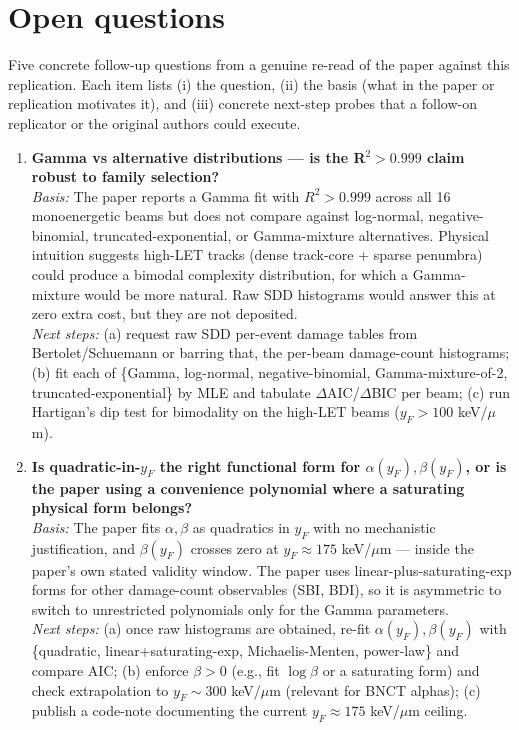 \section{Open questions}

Five concrete follow-up questions from a genuine re-read of the paper against
this replication. Each item lists (i) the question, (ii) the basis (what in
the paper or replication motivates it), and (iii) concrete next-step probes
that a follow-on replicator or the original authors could execute.

\begin{enumerate}

\item \textbf{Gamma vs alternative distributions --- is the R$^2 > 0.999$ claim
robust to family selection?} \\
\emph{Basis:} The paper reports a Gamma fit with $R^2 > 0.999$ across all 16
monoenergetic beams but does not compare against log-normal, negative-binomial,
truncated-exponential, or Gamma-mixture alternatives. Physical intuition
suggests high-LET tracks (dense track-core + sparse penumbra) could produce a
bimodal complexity distribution, for which a Gamma-mixture would be more
natural. Raw SDD histograms would answer this at zero extra cost, but they
are not deposited. \\
\emph{Next steps:} (a) request raw SDD per-event damage tables from
Bertolet/Schuemann or barring that, the per-beam damage-count histograms;
(b) fit each of \{Gamma, log-normal, negative-binomial, Gamma-mixture-of-2,
truncated-exponential\} by MLE and tabulate $\Delta$AIC/$\Delta$BIC per beam;
(c) run Hartigan's dip test for bimodality on the high-LET beams
($y_F > 100$ keV/$\mu$m).

\item \textbf{Is quadratic-in-$y_F$ the right functional form for
$\alpha(y_F), \beta(y_F)$, or is the paper using a convenience polynomial
where a saturating physical form belongs?} \\
\emph{Basis:} The paper fits $\alpha, \beta$ as quadratics in $y_F$ with no
mechanistic justification, and $\beta(y_F)$ crosses zero at $y_F \approx 175$
keV/$\mu$m --- inside the paper's own stated validity window. The paper uses
linear-plus-saturating-exp forms for other damage-count observables (SBI, BDI),
so it is asymmetric to switch to unrestricted polynomials only for the Gamma
parameters. \\
\emph{Next steps:} (a) once raw histograms are obtained, re-fit
$\alpha(y_F), \beta(y_F)$ with \{quadratic, linear+saturating-exp,
Michaelis-Menten, power-law\} and compare AIC; (b) enforce $\beta > 0$
(e.g., fit $\log \beta$ or a saturating form) and check extrapolation to
$y_F \sim 300$ keV/$\mu$m (relevant for BNCT alphas); (c) publish a code-note
documenting the current $y_F \approx 175$ keV/$\mu$m ceiling.


\end{enumerate}
